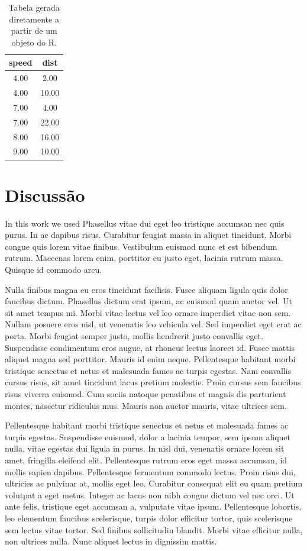 \documentclass[book,A4paper,10pt,twoside,oldfontcommands]{memoir}\usepackage[]{graphicx}\usepackage[usenames,dvipsnames]{color}
\begin{document}
\begin{btUnit}
\begin{table}[!htb]
\centering
\caption{Tabela gerada diretamente a partir de um objeto do R.} 
\label{tab:res}
\begin{tabular}{cc}
  \hline
speed & dist \\ 
  \hline
4.00 & 2.00 \\ 
  4.00 & 10.00 \\ 
  7.00 & 4.00 \\ 
  7.00 & 22.00 \\ 
  8.00 & 16.00 \\ 
  9.00 & 10.00 \\ 
   \hline
\end{tabular}
\end{table}


\section{Discussão}

In this work we used Phasellus vitae dui eget leo tristique accumsan
nec quis purus. In ac dapibus risus. Curabitur feugiat massa in
aliquet tincidunt. Morbi congue quis lorem vitae finibus. Vestibulum
euismod nunc et est bibendum rutrum. Maecenas lorem enim, porttitor eu
justo eget, lacinia rutrum massa. Quisque id commodo arcu.

Nulla finibus magna eu eros tincidunt facilisis. Fusce aliquam ligula
quis dolor faucibus dictum. Phasellus dictum erat ipsum, ac euismod
quam auctor vel. Ut sit amet tempus mi. Morbi vitae lectus vel leo
ornare imperdiet vitae non sem. Nullam posuere eros nisl, ut venenatis
leo vehicula vel. Sed imperdiet eget erat ac porta. Morbi feugiat
semper justo, mollis hendrerit justo convallis eget. Suspendisse
condimentum eros augue, at rhoncus lectus laoreet id. Fusce mattis
aliquet magna sed porttitor. Mauris id enim neque. Pellentesque
habitant morbi tristique senectus et netus et malesuada fames ac
turpis egestas. Nam convallis cursus risus, sit amet tincidunt lacus
pretium molestie. Proin cursus sem faucibus risus viverra euismod. Cum
sociis natoque penatibus et magnis dis parturient montes, nascetur
ridiculus mus. Mauris non auctor mauris, vitae ultrices sem.

Pellentesque habitant morbi tristique senectus et netus et malesuada
fames ac turpis egestas. Suspendisse euismod, dolor a lacinia tempor,
sem ipsum aliquet nulla, vitae egestas dui ligula in purus. In nisl
dui, venenatis ornare lorem sit amet, fringilla eleifend elit.
Pellentesque rutrum eros eget massa accumsan, id mollis sapien
dapibus. Pellentesque fermentum commodo lectus. Proin risus dui,
ultricies ac pulvinar at, mollis eget leo. Curabitur consequat elit eu
quam pretium volutpat a eget metus. Integer ac lacus non nibh congue
dictum vel nec orci. Ut ante felis, tristique eget accumsan a,
vulputate vitae ipsum. Pellentesque lobortis, leo elementum faucibus
scelerisque, turpis dolor efficitur tortor, quis scelerisque sem
lectus vitae tortor. Sed finibus sollicitudin blandit. Morbi vitae
efficitur nulla, non ultrices nulla. Nunc aliquet lectus in dignissim
mattis.


\end{btUnit}
\end{document}
